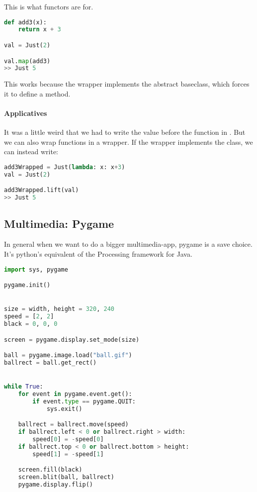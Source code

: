 This is what functors are for. 
\begin{lstlisting}[language=python]
def add3(x):
    return x + 3

val = Just(2)

val.map(add3)
>> Just 5
\end{lstlisting}

This works because the  wrapper implements the abstract  baseclass, which forces it to define a  method. 


\paragraph{Applicatives} It was a little weird that we had to write the value before the function in . But we can also wrap functions in a wrapper. If the wrapper implements the  class, we can instead write:

\begin{lstlisting}[language=python]
add3Wrapped = Just(lambda: x: x+3)
val = Just(2)

add3Wrapped.lift(val)
>> Just 5
\end{lstlisting}


\subsection{Multimedia: Pygame}

In general when we want to do  a bigger multimedia-app, pygame is a save choice. It's python's equivalent of the Processing framework for Java. 

\begin{lstlisting}[language=python]
import sys, pygame

pygame.init()


size = width, height = 320, 240
speed = [2, 2]
black = 0, 0, 0

screen = pygame.display.set_mode(size)

ball = pygame.image.load("ball.gif")
ballrect = ball.get_rect()


while True: 
    for event in pygame.event.get():
        if event.type == pygame.QUIT: 
            sys.exit()

    ballrect = ballrect.move(speed)
    if ballrect.left < 0 or ballrect.right > width:
        speed[0] = -speed[0]
    if ballrect.top < 0 or ballrect.bottom > height:
        speed[1] = -speed[1]

    screen.fill(black)
    screen.blit(ball, ballrect)
    pygame.display.flip()

\end{lstlisting}


